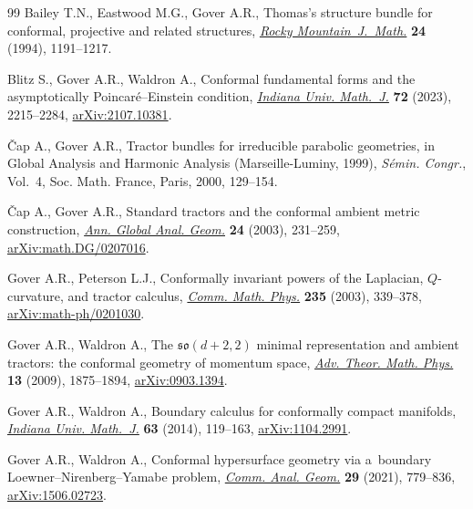 \documentclass[11pt]{article}
\numberwithin{equation}{section}
\renewcommand{\=}{\stackrel \Lambda =}
\begin{document}
\begin{thebibliography}{99}
Bailey T.N., Eastwood M.G., Gover A.R., Thomas's structure bundle for
 conformal, projective and related structures, \href{https://doi.org/10.1216/rmjm/1181072333}{\textit{Rocky
 Mountain~J.~Math.}} \textbf{24} (1994), 1191--1217.

Blitz S., Gover A.R., Waldron A., Conformal fundamental forms and the
 asymptotically {P}oincar\'e--{E}instein condition, \href{https://doi.org/10.1512/iumj.2023.72.9518}{\textit{Indiana Univ.
 Math.~J.}} \textbf{72} (2023), 2215--2284, \href{https://arxiv.org/abs/2107.10381}{arXiv:2107.10381}.

{\v{C}}ap A., Gover A.R., Tractor bundles for irreducible parabolic geometries,
 in Global Analysis and Harmonic Analysis ({M}arseille-{L}uminy, 1999),
 \textit{S\'emin. Congr.}, Vol.~4, Soc. Math. France, Paris, 2000, 129--154.

{\v{C}}ap A., Gover A.R., Standard tractors and the conformal ambient metric
 construction, \href{https://doi.org/10.1023/A:1024726607595}{\textit{Ann. Global Anal. Geom.}} \textbf{24} (2003), 231--259,
 \href{https://arxiv.org/abs/math.DG/0207016}{arXiv:math.DG/0207016}.

Gover A.R., Peterson L.J., Conformally invariant powers of the {L}aplacian,
 {$Q$}-curvature, and tractor calculus, \href{https://doi.org/10.1007/s00220-002-0790-4}{\textit{Comm. Math. Phys.}}
 \textbf{235} (2003), 339--378, \href{https://arxiv.org/abs/math-ph/0201030}{arXiv:math-ph/0201030}.

Gover A.R., Waldron A., The {$\mathfrak{so}(d+2,2)$} minimal representation and
 ambient tractors: the conformal geometry of momentum space, \href{https://doi.org/10.4310/atmp.2009.v13.n6.a7}{\textit{Adv.
 Theor. Math. Phys.}} \textbf{13} (2009), 1875--1894, \href{https://arxiv.org/abs/0903.1394}{arXiv:0903.1394}.

Gover A.R., Waldron A., Boundary calculus for conformally compact manifolds,
 \href{https://doi.org/10.1512/iumj.2014.63.5057}{\textit{Indiana Univ. Math.~J.}} \textbf{63} (2014), 119--163,
 \href{https://arxiv.org/abs/1104.2991}{arXiv:1104.2991}.

Gover A.R., Waldron A., Conformal hypersurface geometry via a~boundary
 {L}oewner--{N}irenberg--{Y}amabe problem, \href{https://doi.org/10.4310/CAG.2021.v29.n4.a2}{\textit{Comm. Anal. Geom.}}
 \textbf{29} (2021), 779--836, \href{https://arxiv.org/abs/1506.02723}{arXiv:1506.02723}.


\end{thebibliography}
\end{document}
